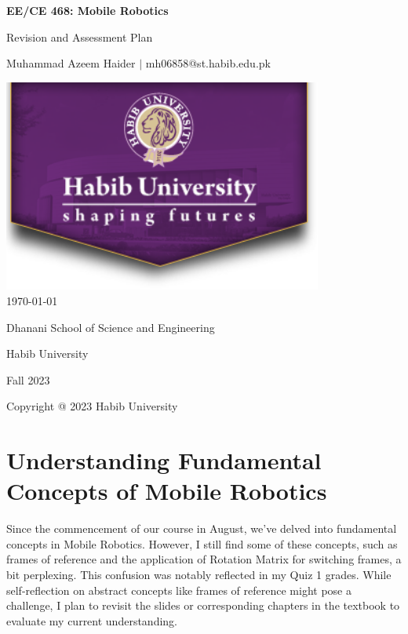 \documentclass[12pt]{article}
\begin{document}
\begin{titlepage}
    \centering
    {\LARGE\textbf{EE/CE 468: Mobile Robotics}\par}
    \vspace{0.5cm}
    {\Large Revision and Assessment Plan\par}
    \vspace*{\fill} %
    {\large Muhammad Azeem Haider $\mid$ mh06858@st.habib.edu.pk\par}
    \vspace{2cm}
    \includegraphics[height=7cm]{../HU_logo.png}\\\bigskip
    {\large \today}\\\bigskip\bigskip
    \vspace{2cm}
    {\large Dhanani School of Science and Engineering\par}
    {\large Habib University\par}
    {\large Fall 2023\par}
    \vspace*{\fill} %
    {\large Copyright @ 2023 Habib University\par}
\end{titlepage}

\thispagestyle{empty} %
\clearpage

\section{Understanding Fundamental Concepts of Mobile Robotics}

Since the commencement of our course in August, we've delved into fundamental concepts in Mobile Robotics. However, I still find some of these concepts, such as frames of reference and the application of Rotation Matrix for switching frames, a bit perplexing. This confusion was notably reflected in my Quiz 1 grades. While self-reflection on abstract concepts like frames of reference might pose a challenge, I plan to revisit the slides or corresponding chapters in the textbook to evaluate my current understanding.
\end{document}
